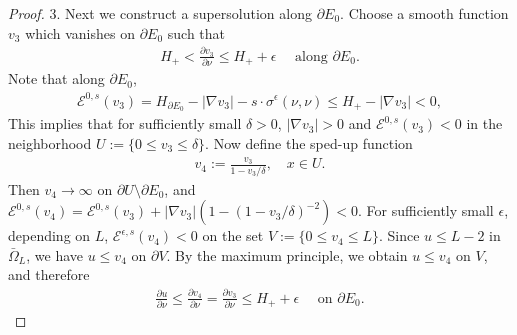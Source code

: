 \documentclass[11pt, letterpaper]{amsart}
\theoremstyle{definition}
\theoremstyle{remark}
\begin{document}
\begin{appendix}
\begin{proof}
3. Next we construct a supersolution along $\partial E_0$. Choose a smooth function $v_3$ which vanishes on $\partial E_0$ such that 
\begin{align*}
	H_{+} < \frac{\partial v_3}{\partial \nu } \leq H_+  + \epsilon \quad \text{ along } \partial E_0.
\end{align*}
Note that along $\partial E_0$, 
\begin{align*}
	\mathcal{E}^{0, s}(v_3) = H_{\partial E_0} - |\nabla v_3| - s \cdot \sigma ^{\epsilon } (\nu ,\nu ) \leq H_{+}   - |\nabla v_3| <0, 
\end{align*}
This implies that for sufficiently small $\delta >0$, $|\nabla v_3|>0$ and $\mathcal{E}^{0,s}(v_3)<0$ in the neighborhood $U:= \{ 0 \leq v_3 \leq \delta \} $. Now define the sped-up function
 \begin{align*}
	v_4 := \frac{v_3}{1- v_3 / \delta },\quad x \in U.
\end{align*} 
Then $v_4 \to \infty$ on $\partial U \setminus \partial E_0$, and $\mathcal{E}^{0,s}(v_4) = \mathcal{E}^{0,s}(v_3) + |\nabla v_3|\left( 1- (1- v_3 / \delta )^{-2} \right) <0 $. For sufficiently small $\epsilon $, depending on $L$, $\mathcal{E}^{\epsilon ,s}(v_4) <0 $ on the set $V:= \{0 \leq v_4 \leq L\} $. Since $u \leq L-2$ in $\bar{\Omega }_{L}$, we have $u \leq v_4$ on $\partial V$. By the maximum principle, we obtain $u \leq v_4$ on $V$, and therefore
\begin{align}\label{v4-upper}
	\frac{\partial u}{\partial \nu } \leq \frac{\partial v_4}{\partial \nu }= \frac{\partial v_3}{\partial \nu } \leq H_+ + \epsilon \quad \text{ on } \partial E_0.
\end{align} 


\end{proof}
\end{appendix}
\end{document}
